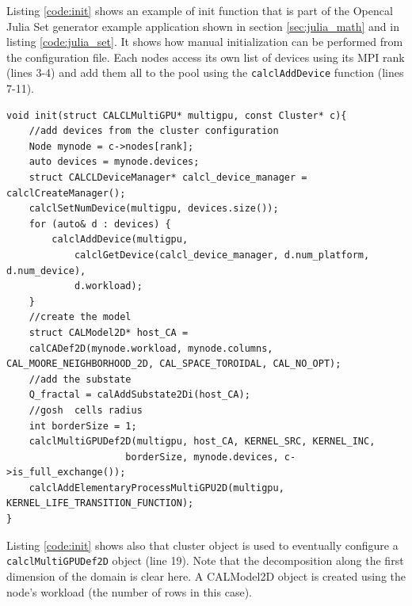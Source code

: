 Listing \ref{code:init} shows an example of init function that is part of the Opencal Julia Set generator example application shown in section \ref{sec:julia_math} and in listing \ref{code:julia_set}. It shows how manual initialization can be performed from the configuration file. Each nodes access its own list of devices using its MPI rank (lines 3-4)  and add them all to the pool using the \texttt{calclAddDevice} function (lines 7-11).
\begin{lstlisting}
void init(struct CALCLMultiGPU* multigpu, const Cluster* c){
    //add devices from the cluster configuration
    Node mynode = c->nodes[rank];
    auto devices = mynode.devices;
    struct CALCLDeviceManager* calcl_device_manager = calclCreateManager();
    calclSetNumDevice(multigpu, devices.size());
    for (auto& d : devices) {
        calclAddDevice(multigpu, 
            calclGetDevice(calcl_device_manager, d.num_platform, d.num_device),
            d.workload);
    }
    //create the model    
    struct CALModel2D* host_CA =
    calCADef2D(mynode.workload, mynode.columns, CAL_MOORE_NEIGHBORHOOD_2D, CAL_SPACE_TOROIDAL, CAL_NO_OPT);
    //add the substate
    Q_fractal = calAddSubstate2Di(host_CA);
    //gosh  cells radius
    int borderSize = 1;
    calclMultiGPUDef2D(multigpu, host_CA, KERNEL_SRC, KERNEL_INC,
                     borderSize, mynode.devices, c->is_full_exchange());
    calclAddElementaryProcessMultiGPU2D(multigpu,     KERNEL_LIFE_TRANSITION_FUNCTION);
}
\end{lstlisting}
Listing \ref{code:init} shows also that cluster object is used to eventually configure a \texttt{calclMultiGPUDef2D} object (line 19). 
Note that the decomposition along the first dimension of the domain is clear here. A CALModel2D object is created using the node's workload (the number of rows in this case).

